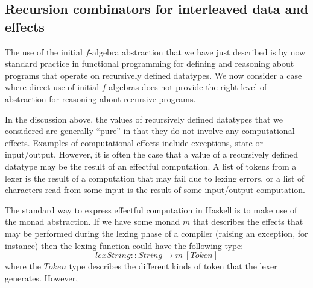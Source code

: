 \subsection{Recursion combinators for interleaved data and effects}

The use of the initial $f$-algebra abstraction that we have just
described is by now standard practice in functional programming for
defining and reasoning about programs that operate on recursively
defined datatypes. We now consider a case where direct use of initial
$f$-algebras does not provide the right level of abstraction for
reasoning about recursive programs.

In the discussion above, the values of recursively defined datatypes
that we considered are generally ``pure'' in that they do not involve
any computational effects. Examples of computational effects include
exceptions, state or input/output. However, it is often the case that
a value of a recursively defined datatype may be the result of an
effectful computation. A list of tokens from a lexer is the result of
a computation that may fail due to lexing errors, or a list of
characters read from some input is the result of some input/output
computation.

The standard way to express effectful computation in Haskell is to
make use of the monad abstraction. If we have some monad $m$ that
describes the effects that may be performed during the lexing phase of
a compiler (raising an exception, for instance) then the lexing
function could have the following type:
\begin{displaymath}
  \mathit{lexString} :: \mathit{String} \to m~[\mathit{Token}]
\end{displaymath}
where the $\mathit{Token}$ type describes the different kinds of token
that the lexer generates. However, 




